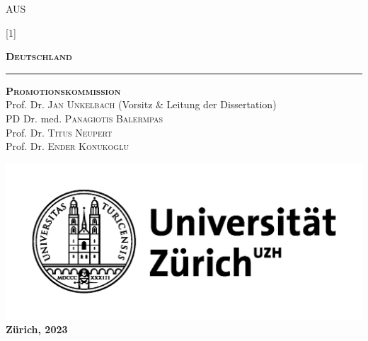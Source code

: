 \documentclass[\relativeRoot/main.tex]{subfiles}
\begin{document}
\begin{titlepage}
\begin{center}
            {\footnotesize AUS} \vfill

            \scalebox{0.8}[1]{\begin{minipage}{1.0\textwidth}
                \centering
                \bfseries
                \scshape
                \Large
                Deutschland
            \end{minipage}} \vspace{3cm}
            
            \rule{2cm}{0.5pt} \vspace{5mm}
            
            \textbf{\scshape Promotionskommission}\\
            \vspace{2mm}
            Prof. Dr. {\scshape Jan Unkelbach} {\small (Vorsitz \& Leitung der Dissertation)}\\
            PD Dr. med. {\scshape Panagiotis Balermpas}\\
            Prof. Dr. {\scshape Titus Neupert}\\
            Prof. Dr. {\scshape Ender Konukoglu}

            \vfill

            \includegraphics[scale=1.0]{figures/uzh_logo_d_pos_standard.png}\\
            \textbf{Zürich, 2023} \vfill
                
        \end{center}
    \end{titlepage}
\end{document}
